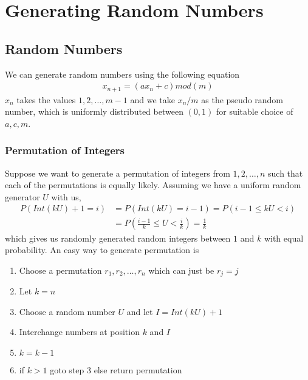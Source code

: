 \documentclass[../probability-notes.tex]{subfiles}
\begin{document}
    \section{Generating Random Numbers}
    \subsection{Random Numbers}
    We can generate random numbers using the following equation
    \begin{align*}
        x_{n+1} = (ax_{n} + c) mod(m)
    \end{align*}
    $x_{n}$ takes the values $1,2,\ldots, m-1$ and we take $x_{n}/m$ as the pseudo random number, which is uniformly distributed between $(0,1)$ for suitable choice of $a, c, m$.\newline

    
    \subsubsection{Permutation of Integers}
    Suppose we want to generate a permutation of integers from $1, 2, \ldots, n$ such that each of the permutations is equally likely. Assuming we have a uniform random generator $U$ with us, 
    \begin{align*}
        P(Int(kU) + 1 = i) &= P(Int(kU) = i-1) = P(i-1 \leq kU < i)\\
        &= P(\frac{i-1}{k} \leq U < \frac{i}{k}) = \frac{1}{k}
    \end{align*}
    which gives us randomly generated random integers between $1$ and $k$ with equal probability. An easy way to generate permutation is
    \begin{enumerate}
        \item Choose a permutation $r_{1}, r_{2}, \ldots, r_{n}$ which can just be $r_{j} = j$
        \item Let $k = n$
        \item Choose a random number $U$ and let $I = Int(kU) + 1$
        \item Interchange numbers at position $k$ and $I$
        \item $k = k-1$
        \item if $k > 1$ goto step 3 else return permutation
    \end{enumerate}
\end{document}
